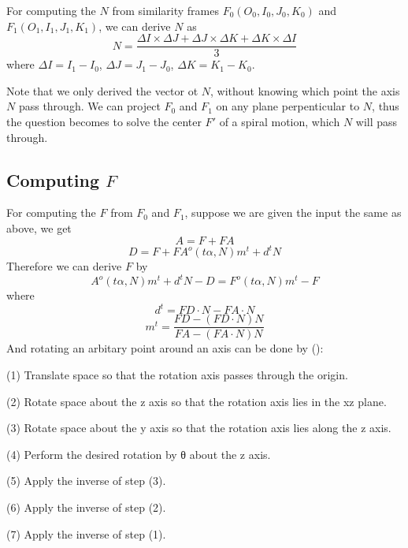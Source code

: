 \documentclass[twoside,11pt]{article}
\begin{document}
For computing the $N$ from similarity frames $F_0(O_0,I_0,J_0,K_0)$ and $F_1(O_1,I_1,J_1,K_1)$, we can derive $N$ as
\begin{equation}
N = \frac{\Delta I \times \Delta J + \Delta J \times \Delta K + \Delta K \times \Delta I}{3}
\end{equation}
where $\Delta I = I_1 - I_0$, $\Delta J = J_1 - J_0$, $\Delta K = K_1 - K_0$.

Note that we only derived the vector ot $N$, without knowing which point the axis $N$ pass through. We can project $F_0$ and $F_1$ on any plane perpenticular to $N$, thus the question becomes to solve the center $F'$ of a spiral motion, which $N$ will pass through.


\subsection{Computing $F$}
For computing the $F$ from $F_0$ and $F_1$, suppose we are given the input the same as above, we get
\begin{equation}
A = F + FA
\end{equation}
\begin{equation}
D = F + FA^o (t\alpha, N) m^t + d^t N
\end{equation}
Therefore we can derive $F$ by
\begin{equation}
A^o (t\alpha, N) m^t + d^t N - D = F^o (t\alpha, N) m^t - F
\end{equation}
where
\begin{equation}
d^t = FD \cdot N - FA \cdot N 
\end{equation}
\begin{equation}
m^t = \frac{FD - (FD \cdot N) N }{FA - (FA \cdot N) N}
\end{equation}
And rotating an arbitary point around an axis can be done by (\cite{murray13}): 

(1) Translate space so that the rotation axis passes through the origin.

(2) Rotate space about the z axis so that the rotation axis lies in the xz plane.

(3) Rotate space about the y axis so that the rotation axis lies along the z axis.

(4) Perform the desired rotation by θ about the z axis.

(5) Apply the inverse of step (3).

(6) Apply the inverse of step (2).

(7) Apply the inverse of step (1).
\end{document}
